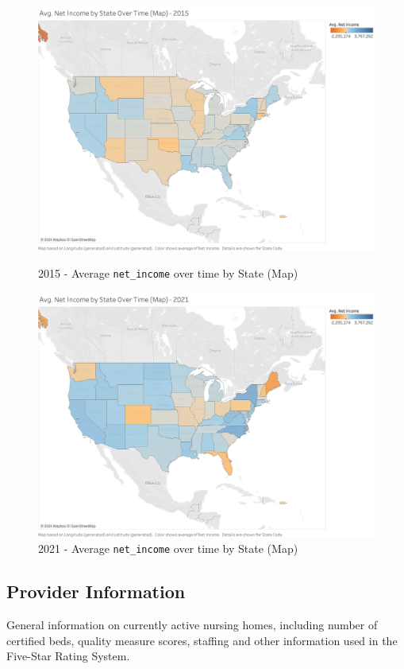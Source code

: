 \documentclass{article}
\theoremstyle{mytheoremstyle}
\theoremstyle{mytheoremstyle}
\theoremstyle{myproblemstyle}
\begin{document}
\pagebreak
\begin{figure}[!h]
\centering
\begin{minipage}{\linewidth}
    \centering %
    \includegraphics[width=0.75\linewidth]{Images/Avg. Net Income by State Over Time (Map).png}
    \caption{2015 - Average \texttt{net\_income} over time by State (Map)}
    \label{fig:net_income_map}
\end{minipage}\vspace{1cm} %

\begin{minipage}{\linewidth}
    \centering %
    \includegraphics[width=0.75\linewidth]{Images/Avg. Net Income by State Over Time (Map)2021.png}
    \caption{2021 - Average \texttt{net\_income} over time by State (Map)}
    \label{fig:net_income_map_2021}
\end{minipage}
\end{figure}

\pagebreak

\subsection{Provider Information}
General information on currently active nursing homes, including number of certified beds, quality measure scores, staffing and other information used in the Five-Star Rating System.
\end{document}
